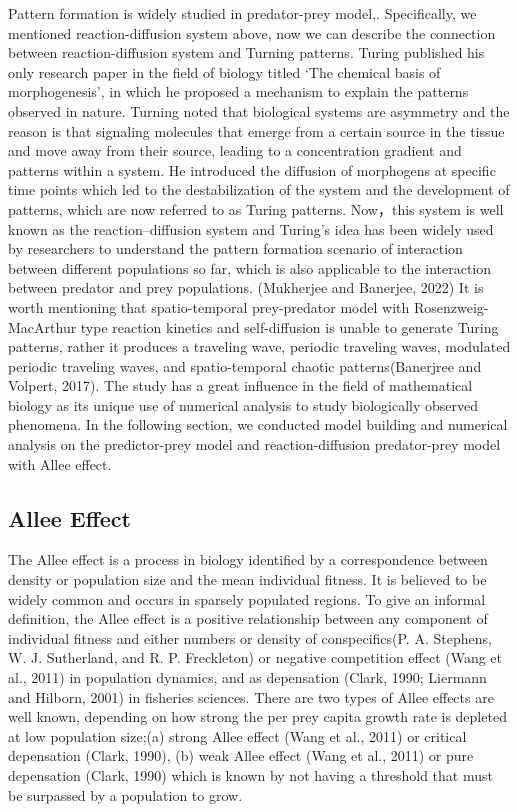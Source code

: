 \documentclass[12pt]{article}
\begin{document}
\noindent Pattern formation is widely studied in predator-prey model,. Specifically, we mentioned reaction-diffusion system above, now we can describe the connection between reaction-diffusion system and Turning patterns. Turing published his only research paper in the field of biology titled ‘The chemical basis of morphogenesis', in which he proposed a mechanism to explain the patterns observed in nature. Turning noted that biological systems are asymmetry and the reason is that signaling molecules that emerge from a certain source in the tissue and move away from their source, leading to a concentration gradient and patterns within a system. He introduced the diffusion of morphogens at specific time points which led to the destabilization of the system and the development of patterns, which are now referred to as Turing patterns. Now，this system is well known as the reaction–diffusion system and Turing's idea has been widely used by researchers to understand the pattern formation scenario of interaction between different populations so far, which is also applicable to the interaction between predator and prey populations. (Mukherjee and Banerjee, 2022) It is worth mentioning that spatio-temporal prey-predator model with Rosenzweig-MacArthur type reaction kinetics and self-diffusion is unable to generate Turing patterns, rather it produces a traveling wave, periodic traveling waves, modulated periodic traveling waves, and spatio-temporal chaotic patterns(Banerjree and Volpert, 2017). The study has a great influence in the field of mathematical biology as its unique use of numerical analysis to study biologically observed phenomena. In the following section, we conducted model building and numerical analysis on the predictor-prey model and reaction-diffusion predator-prey model with Allee effect.
\vspace{24pt}

\subsection{Allee Effect}
\noindent The Allee effect is a process in biology identified by a correspondence between density or population size and the mean individual fitness. It is believed to be widely common and occurs in sparsely populated regions. To give an informal definition, the Allee effect is a positive relationship between any component of individual fitness and either numbers or density of conspecifics(P. A. Stephens, W. J. Sutherland, and R. P. Freckleton) or negative competition effect (Wang et al., 2011) in population dynamics, and as depensation (Clark, 1990; Liermann and Hilborn, 2001) in fisheries sciences. There are two types of Allee effects are well known, depending on how strong the per prey capita growth rate is depleted at low population size;(a) strong Allee effect  (Wang et al., 2011) or critical depensation (Clark, 1990), (b) weak Allee effect (Wang et al., 2011) or pure depensation (Clark, 1990) which is known by not having a threshold that must be surpassed by a population to grow.
\vspace{24pt}
\end{document}
